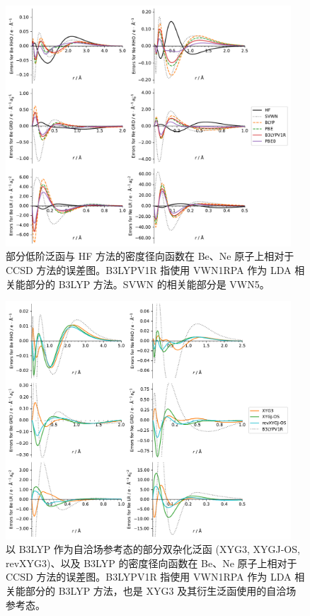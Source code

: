 \begin{figure}[hp]
    \centering
    \includegraphics[width=0.95\textwidth]{assets/supp-fig-s2.pdf}
    \caption{部分低阶泛函与 HF 方法的密度径向函数在 Be、Ne 原子上相对于 CCSD 方法的误差图。B3LYPV1R 指使用 VWN1RPA 作为 LDA 相关能部分的 B3LYP 方法。SVWN 的相关能部分是 VWN5。}
    \label{fig.4.supp-fig-s2}
\end{figure}

\begin{figure}[hp]
    \centering
    \includegraphics[width=0.95\textwidth]{assets/supp-fig-s3.pdf}
    \caption{以 B3LYP 作为自洽场参考态的部分双杂化泛函 (XYG3, XYGJ-OS, revXYG3)、以及 B3LYP 的密度径向函数在 Be、Ne 原子上相对于 CCSD 方法的误差图。B3LYPV1R 指使用 VWN1RPA 作为 LDA 相关能部分的 B3LYP 方法，也是 XYG3 及其衍生泛函使用的自洽场参考态。}
    \label{fig.4.supp-fig-s3}
\end{figure}

